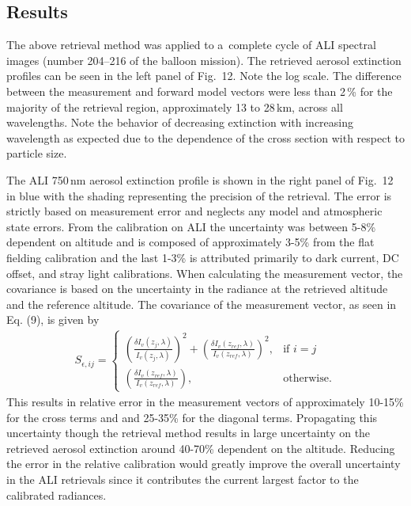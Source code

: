 \documentclass[amtd, online, hvmath]{copernicus}
\begin{document}
\subsection{Results}

The above retrieval method was applied to a~complete cycle of ALI
spectral images (number 204--216 of the balloon mission). The
retrieved aerosol extinction profiles can be seen in the left panel of
Fig.~12. Note the log scale. The difference
between the measurement and forward model vectors were less than
2\,{\%} for the majority of the retrieval region, approximately 13 to
28\,\unit{km}, across all wavelengths. Note the behavior of decreasing
extinction with increasing wavelength as expected due to the
dependence of the cross section with respect to particle size.

The ALI 750\,\unit{nm} aerosol extinction profile is shown in the
right panel of Fig.~12 in blue with the shading representing the
precision of the retrieval. The error is strictly based on measurement
error and neglects any model and atmospheric state errors. From the calibration on ALI the uncertainty was between 5-8\% dependent on altitude and is composed of approximately 3-5\% from the flat fielding calibration and the last 1-3\% is attributed primarily to dark current, DC offset, and stray light calibrations. When calculating the measurement vector, the covariance is based on the uncertainty in the radiance at the retrieved altitude and the reference altitude. The covariance of the measurement vector, as seen in Eq. (9), is given by
\begin{align}
S_{\epsilon,ij}=
\begin{cases}
    \left(\frac{\delta I_v(z_{j},\lambda)}{I_v(z_{j},\lambda)}\right)^{2} + \left(\frac{\delta I_v(z_{ref},\lambda)}{I_v(z_{ref},\lambda)}\right)^{2}, & \text{if } i=j\\
    \left(\frac{\delta I_v(z_{ref},\lambda)}{I_v(z_{ref},\lambda)}\right), & \text{otherwise}.
\end{cases}
\end{align}
This results in relative error in the measurement vectors of approximately 10-15\% for the cross terms and and 25-35\% for the diagonal terms. Propagating this uncertainty though the retrieval method results in large uncertainty on the retrieved aerosol extinction around 40-70\% dependent on the altitude. Reducing the error in the relative calibration would greatly improve the overall uncertainty in the ALI retrievals since it contributes the current largest factor to the calibrated radiances.
\end{document}
